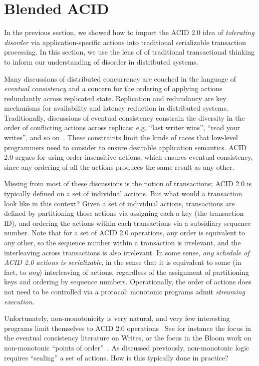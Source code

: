 \documentclass{sig-alternate}
\begin{document}
\section{Blended ACID}
In the previous section, we showed how to import the ACID 2.0 idea of \emph{tolerating disorder} via application-specific actions into traditional serializable transaction processing. In this section, we use the lens of of traditional transactional thinking to inform our understanding of disorder in distributed systems.

Many discussions of distributed concurrency are couched in the language of \emph{eventual consistency} and a concern for the ordering of applying actions redundantly across replicated state.  Replication and redundancy are key mechanisms for availability and latency reduction in distributed systems.  Traditionally, discussions of eventual consistency constrain the diversity in the order of conflicting actions across replicas: e.g. ``last writer wins'', ``read your writes'', and so on~\cite{terry}.  These constraints limit the kinds of races that low-level programmers need to consider to ensure desirable application semantics.  ACID 2.0 argues for using order-insensitive actions, which ensures eventual consistency, since any ordering of all the actions produces the same result as any other.

Missing from most of these discussions is the notion of transactions; ACID 2.0 is typically defined on a set of individual actions.  But what would a transaction look like in this context?  Given a set of individual actions, transactions are defined by partitioning those actions via assigning each a key (the transaction ID), and ordering the actions within each transactions via a subsidiary sequence number.  Note that for a set of ACID 2.0 operations, any order is equivalent to any other, so the sequence number within a transaction is irrelevant, and the interleaving across transactions is also irrelevant.  In some sense, \emph{any schedule of ACID 2.0 actions is serializable}, in the sense that it is equivalent to some (in fact, to \emph{any}) interleaving of actions, regardless of the assignment of partitioning keys and ordering by sequence numbers.  Operationally, the order of actions does not need to be controlled via a protocol: monotonic programs admit \emph{streaming execution}.

Unfortunately, non-monotonicity is very natural, and very few interesting programs limit themselves to ACID 2.0 operations~\cite{There is, however, an intriguing theoretical result due independently to Immerman, Vardi and Papadimitriou that monotonic logic with sequences can express any polynomial-time computation.  In our experience to date, this is more intriguing than practical.}  See for instance the focus in the eventual consistency literature on Writes, or the focus in the Bloom work on non-monotonic ``points of order''~\cite{cidr11}.  As discussed previously, non-monotonic logic requires ``sealing'' a set of actions.  How is this typically done in practice?
\end{document}
